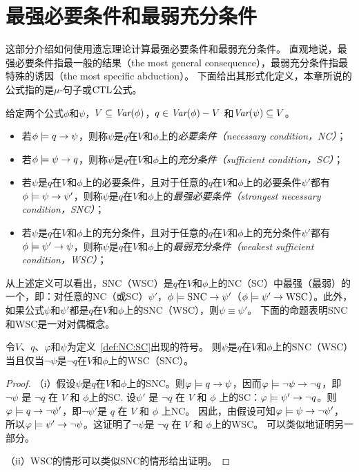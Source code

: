 \section{最强必要条件和最弱充分条件}\label{chapter07:sec:snc}
这部分介绍如何使用遗忘理论计算最强必要条件和最弱充分条件。
直观地说，最强必要条件指最一般的结果（the most general consequence），最弱充分条件指最特殊的诱因（the most specific abduction）。
下面给出其形式化定义，本章所说的公式指的是$\mu$-句子或$\textrm{CTL}$公式。
\begin{definition}[充分和必要条件]\label{def:NC:SC}
	给定两个公式$\phi$和$\psi$，$V \subseteq \textit{Var}(\phi)$，$q\in\textit{Var}(\phi)- V$
	和$\textit{Var}(\psi)\subseteq V$。
	\begin{itemize}
		\item 若$\phi \models q \rightarrow \psi$，则称$\psi$是$q$在$V$和$\phi$上的{\em 必要条件（necessary condition，NC）}；
		\item 若$\phi \models \psi\rightarrow q$，则称$\psi$是$q$在$V$和$\phi$上的{\em 充分条件（sufficient condition，SC）}；
		\item 若$\psi$是$q$在$V$和$\phi$上的必要条件，且对于任意的$q$在$V$和$\phi$上的必要条件$\psi'$都有$\phi\models\psi\rightarrow\psi'$，则称$\psi$是$q$在$V$和$\phi$上的{\em 最强必要条件（strongest necessary condition，SNC）}；
		\item 若$\psi$是$q$在$V$和$\phi$上的充分条件，且对于任意的$q$在$V$和$\phi$上的充分条件$\psi'$都有$\phi\models\psi'\rightarrow\psi$，则称$\psi$是$q$在$V$和$\phi$上的{\em 最弱充分条件（weakest sufficient condition，WSC）}；
	\end{itemize}
\end{definition}

从上述定义可以看出，SNC（WSC）是$q$在$V$和$\phi$上的NC（SC）中最强（最弱）的一个，即：对任意的NC（或SC）$\psi'$，$\phi \models \hbox{SNC} \rightarrow \psi'$（$\phi \models \psi' \rightarrow \hbox{WSC}$）。此外，如果公式$\psi$和$\psi'$都是$q$在$V$和$\phi$上的SNC（WSC），则$\psi \equiv \psi'$。
下面的命题表明SNC和WSC是一对对偶概念。

\begin{proposition}[对偶性]\label{dual}
	令$V$、$q$、$\varphi$和$\psi$为定义~\ref{def:NC:SC}出现的符号。
	则$\psi$是$q$在$V$和$\phi$上的SNC（WSC）当且仅当$\neg \psi$是$\neg q$在$V$和$\phi$上的WSC（SNC）。
\end{proposition}
\begin{proof}
	（i）假设$\psi$是$q$在$V$和$\phi$上的SNC。则$\varphi \models q \rightarrow \psi$，因而$\varphi \models \neg \psi \rightarrow \neg q$，即 $\neg \psi$ 是 $\neg q$ 在 $V$ 和 $\phi$上的SC. 设$\psi'$ 是 $\neg q$ 在 $V$ 和 $\phi$ 上的SC：$\varphi \models \psi' \rightarrow \neg q$。则$\varphi \models q \rightarrow \neg \psi'$，即$\neg \psi'$是 $q$ 在 $V$ 和 $\phi$ 上NC。
	因此，由假设可知$\varphi \models \psi \rightarrow \neg \psi'$，所以$\varphi \models \psi' \rightarrow \neg \psi$。这证明了$\neg \psi$是 $\neg q$ 在 $V$ 和 $\phi$上的WSC。
可以类似地证明另一部分。
	
	（ii）WSC的情形可以类似SNC的情形给出证明。
\end{proof}


